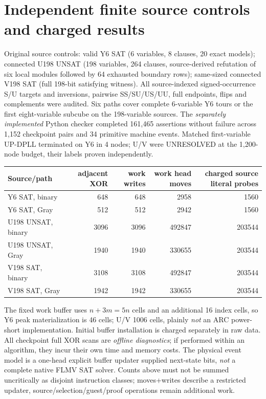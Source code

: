 \documentclass[10pt]{article}
\begin{document}
\section{Independent finite source controls and charged results}
Original source controls: valid Y6 SAT (6 variables, 8 clauses, 20 exact models); connected U198 UNSAT (198 variables, 264 clauses, source-derived refutation of six local modules followed by 64 exhausted boundary rows); same-sized connected V198 SAT (full 198-bit satisfying witness). All source-indexed signed-occurrence S/U targets and inversions, pairwise SS/SU/US/UU, full endpoints, flips and complements were audited. Six paths cover complete 6-variable Y6 tours or the first eight-variable subcube on the 198-variable sources. The \emph{separately implemented} Python checker completed 161,465 assertions without failure across 1,152 checkpoint pairs and 34 primitive machine events. Matched first-variable UP-DPLL terminated on Y6 in 4 nodes; U/V were UNRESOLVED at the 1,200-node budget, their labels proven independently.
\begin{center}\small
\begin{tabular}{lrrrr}
\toprule
Source/path&adjacent XOR&work writes&work head moves&charged source literal probes\\\midrule
Y6 SAT, binary &648&648&2958&1560\\
Y6 SAT, Gray &512&512&2942&1560\\
U198 UNSAT, binary &3096&3096&492847&203544\\
U198 UNSAT, Gray &1940&1940&330655&203544\\
V198 SAT, binary &3108&3108&492847&203544\\
V198 SAT, Gray &1942&1942&330655&203544\\\bottomrule
\end{tabular}
\end{center}
The fixed work buffer uses \(n+3m=5n\) cells and an additional 16 index cells, so Y6 peak materialization is 46 cells; U/V 1006 cells, plainly \emph{not} an ARC power-short implementation. Initial buffer installation is charged separately in raw data. All checkpoint full XOR scans are \emph{offline diagnostics}; if performed within an algorithm, they incur their own time and memory costs. The physical event model is a one-head explicit buffer updater supplied next-state bits, \emph{not} a complete native FLMV SAT solver. Counts above must not be summed uncritically as disjoint instruction classes; moves+writes describe a restricted updater, source/selection/guest/proof operations remain additional work.
\end{document}
